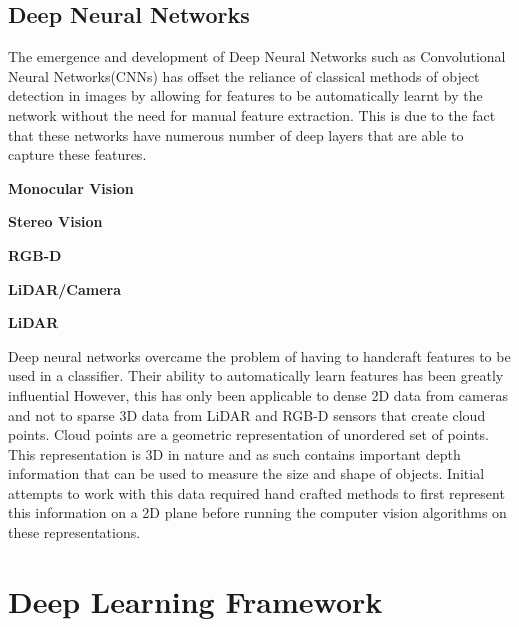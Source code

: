 \subsection{Deep Neural Networks}

The emergence and development of Deep Neural Networks such as Convolutional Neural Networks(CNNs)\cite{lawrence1997face} has offset the reliance of classical methods of object detection in images by allowing for features to be automatically learnt by the network without the need for manual feature extraction. This is due to the fact that these networks have numerous number of deep layers that are able to capture these features.  

\textbf{Monocular Vision}




\textbf{Stereo Vision}



\textbf{RGB-D}



\textbf{LiDAR/Camera}



\textbf{LiDAR}




Deep neural networks overcame the problem of having to handcraft features to be used in a classifier. Their ability to automatically learn features has been greatly influential
However, this has only been applicable to dense 2D data from cameras and not to sparse 3D data from LiDAR and RGB-D sensors that create cloud points. Cloud points are a geometric representation of unordered set of points. This representation is 3D in nature and as such contains important depth information that can be used to measure the size and shape of objects. Initial attempts to work with this data required hand crafted methods to first represent this information on a 2D plane before running the computer vision algorithms on these representations. 











\section{Deep Learning Framework}

